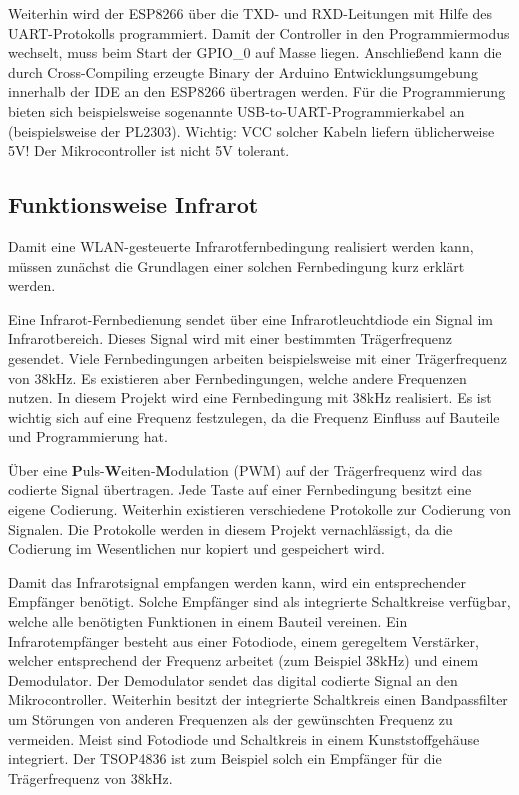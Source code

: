 Weiterhin wird der ESP8266 über die TXD- und RXD-Leitungen mit Hilfe des UART-Protokolls programmiert.
Damit der Controller in den Programmiermodus wechselt, muss beim Start der GPIO\_0 auf Masse liegen.
Anschließend kann die durch Cross-Compiling erzeugte Binary der Arduino Entwicklungsumgebung innerhalb der IDE an den ESP8266 übertragen werden.
Für die Programmierung bieten sich beispielsweise sogenannte USB-to-UART-Programmierkabel an (beispielsweise der PL2303).
Wichtig: VCC solcher Kabeln liefern üblicherweise 5V! Der Mikrocontroller ist nicht 5V tolerant.

\subsection{Funktionsweise Infrarot}
Damit eine WLAN-gesteuerte Infrarotfernbedingung realisiert werden kann, müssen zunächst die Grundlagen einer solchen Fernbedingung kurz erklärt werden.

Eine Infrarot-Fernbedienung sendet über eine Infrarotleuchtdiode ein Signal im Infrarotbereich.
Dieses Signal wird mit einer bestimmten Trägerfrequenz gesendet.
Viele Fernbedingungen arbeiten beispielsweise mit einer Trägerfrequenz von 38kHz.
Es existieren aber Fernbedingungen, welche andere Frequenzen nutzen.
In diesem Projekt wird eine Fernbedingung mit 38kHz realisiert.
Es ist wichtig sich auf eine Frequenz festzulegen, da die Frequenz Einfluss auf Bauteile und Programmierung hat.

Über eine \textbf{P}uls-\textbf{W}eiten-\textbf{M}odulation (PWM) auf der Trägerfrequenz wird das codierte Signal übertragen.
Jede Taste auf einer Fernbedingung besitzt eine eigene Codierung.
Weiterhin existieren verschiedene Protokolle zur Codierung von Signalen.
Die Protokolle werden in diesem Projekt vernachlässigt, da die Codierung im Wesentlichen nur kopiert und gespeichert wird.

Damit das Infrarotsignal empfangen werden kann, wird ein entsprechender Empfänger benötigt.
Solche Empfänger sind als integrierte Schaltkreise verfügbar, welche alle benötigten Funktionen in einem Bauteil vereinen.
Ein Infrarotempfänger besteht aus einer Fotodiode, einem geregeltem Verstärker, welcher entsprechend der Frequenz arbeitet (zum Beispiel 38kHz) und einem Demodulator.
Der Demodulator sendet das digital codierte Signal an den Mikrocontroller.
Weiterhin besitzt der integrierte Schaltkreis einen Bandpassfilter um Störungen von anderen Frequenzen als der gewünschten Frequenz zu vermeiden.
Meist sind Fotodiode und Schaltkreis in einem Kunststoffgehäuse integriert.
Der TSOP4836 ist zum Beispiel solch ein Empfänger für die Trägerfrequenz von 38kHz.

